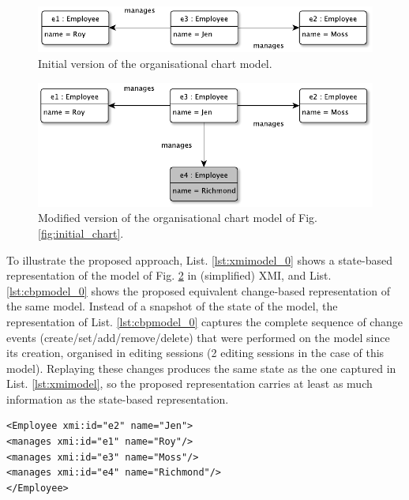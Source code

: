 \documentclass[12pt, a4paper]{report} \usepackage[titletoc]{appendix}
\begin{document}
\begin{figure}[ht]
	\centering
	\includegraphics[width=\linewidth]{initial_chart_0}
	\caption{Initial version of the organisational chart model.}
	\label{fig:initial_chart_0}
\end{figure}

\begin{figure}[ht]
	\centering
	\includegraphics[width=\linewidth]{modified_chart}
	\caption{Modified version of the organisational chart model of Fig. \ref{fig:initial_chart}.}
	\label{fig:modified_chart}
\end{figure}

To illustrate the proposed approach, List. \ref{lst:xmimodel_0} shows a state-based representation of the model of Fig. \ref{fig:modified_chart} in (simplified) XMI, and List. \ref{lst:cbpmodel_0} shows the proposed equivalent change-based representation of the same model. Instead of a snapshot of the state of the model, the representation of List. \ref{lst:cbpmodel_0} captures the complete sequence of change events (create/set/add/remove/delete) that were performed on the model since its creation, organised in editing sessions (2 editing sessions in the case of this model). Replaying these changes produces the same state as the one captured in List. \ref{lst:xmimodel}, so the proposed representation carries at least as much information as the state-based representation.

\begin{lstlisting}[style=xmi,caption={State-based representation of the model of Figure \ref{fig:modified_chart} in (simplified) XMI.},label=lst:xmimodel_0]
<Employee xmi:id="e2" name="Jen">
<manages xmi:id="e1" name="Roy"/>
<manages xmi:id="e3" name="Moss"/>
<manages xmi:id="e4" name="Richmond"/>
</Employee>
\end{lstlisting}
\end{document}
